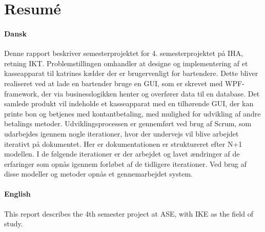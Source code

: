 \chapter{Resumé}
\subsubsection*{Dansk}

Denne rapport beskriver semesterprojektet for 4. semesterprojektet på IHA, retning IKT. Problemstillingen omhandler at designe og implementering af et kasseapparat til 
katrines kælder der er brugervenligt for bartendere. Dette bliver realiseret ved at lade en bartender bruge en GUI, som er skrevet med WPF-framework, der via businesslogikken henter og overfører data til en database. 
\newline
\newline
Det samlede produkt vil indeholde et kasseapparat med en tilhørende GUI, der kan printe bon og betjenes med kontantbetaling, med mulighed for udvikling af andre betalings metoder. 
\newline
\newline
Udviklingsprocessen er gennemført ved brug af Scrum, som udarbejdes igennem nogle iterationer, hvor der undervejs vil blive arbejdet iterativt på dokumentet. Her er dokumentationen er struktureret efter N+1 modellen. I de følgende iterationer er der arbejdet og lavet ændringer af de erfaringer som opnås igennem forløbet af de tidligere iterationer. Ved brug af disse modeller og metoder opnås et gennemarbejdet system.
\newline
\newline
\newline
\newline
\subsubsection*{English}
This report describes the 4th semester project at ASE, with IKE as the field of study. 